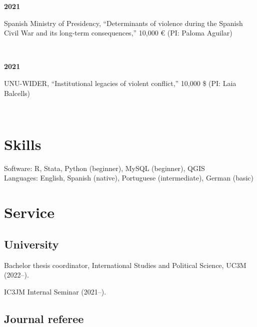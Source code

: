 \documentclass[a4paper, 12pt]{article}
\begin{document}
\begin{minipage}[t]{0.1\textwidth}
\textbf{2021}
\end{minipage}\hfill\begin{minipage}[t]{0.9\textwidth}
Spanish Ministry of Presidency, ``Determinants of violence during the Spanish Civil War and its long-term consequences,'' 10,000 € (PI: Paloma Aguilar)\\\vspace{-8pt}
\end{minipage}\\
\begin{minipage}[t]{0.1\textwidth}
\textbf{2021}
\end{minipage}\hfill\begin{minipage}[t]{0.9\textwidth}
UNU-WIDER, ``Institutional legacies of violent conflict,'' 10,000 \$ (PI: Laia Balcells)
\end{minipage}\\


\vspace{-10pt}
\section*{Skills}

Software: R, Stata, Python (beginner), MySQL (beginner), QGIS\\
Languages: English, Spanish (native), Portuguese (intermediate), German (basic)

\vspace{-10pt}
\section*{Service}

\subsection*{University}

\noindent
Bachelor thesis coordinator, International Studies and Political Science, UC3M (2022--).

\vspace{5pt}\noindent
IC3JM Internal Seminar (2021--).

\subsection*{Journal referee}
\end{document}

